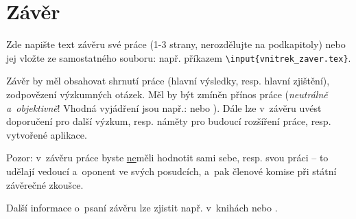 \documentclass[a4paper,oneside,12pt]{book}
\newcommand{\ti}{\textit} %
\begin{document}
\chapter*{Závěr}
%
Zde napište text závěru své práce (1-3 strany, nerozdělujte na podkapitoly) nebo jej vložte ze samostatného souboru: např. příkazem \texttt{\textbackslash input\{vnitrek\_zaver.tex\}}. \par Závěr by měl obsahovat shrnutí práce (hlavní výsledky, resp. hlavní zjištění), zodpovězení výzkumných otázek. Měl by být zmíněn přínos práce (\textit{neutrálně a~objektivně}! Vhodná vyjádření jsou např.:  nebo ). Dále lze v~závěru uvést doporučení pro další výzkum, resp. náměty pro budoucí rozšíření práce, resp. vytvořené aplikace.\par
Pozor: v~závěru práce byste \underline{ne}měli hodnotit sami sebe, resp. svou práci -- to udělají vedoucí a~oponent ve svých posudcích, a~pak členové komise při státní závěrečné zkoušce.\par
Další informace o~psaní závěru lze zjistit např. v~knihách \cite{Kapounova2017} nebo \cite{Mesko2006}.
%
%


\clearpage
{} %


\printbibliography[title={Seznam použitých zdrojů}]




\newpage %
\appendix %
\end{document}
